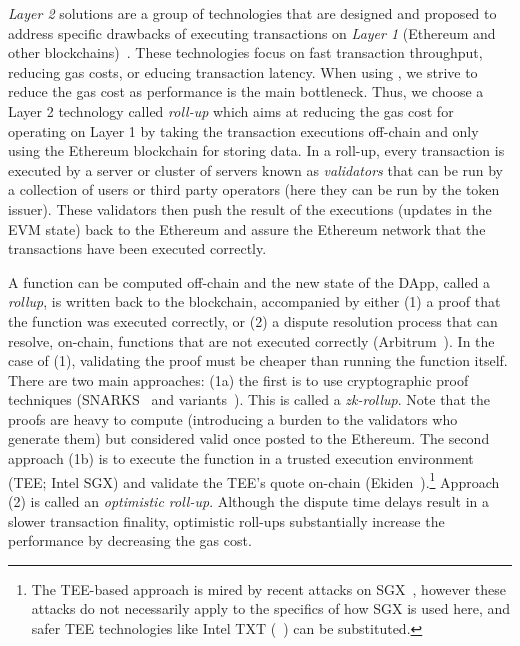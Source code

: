 

\textit{Layer 2} solutions are a group of technologies that are designed and proposed to address specific drawbacks of executing transactions on \textit{Layer 1} (\ie Ethereum and other blockchains)~\cite{gudgeon2020sok}. These technologies focus on fast transaction throughput, reducing gas costs, or educing transaction latency. When using \cm, we strive to reduce the gas cost as performance is the main bottleneck. Thus, we choose a Layer 2 technology called \textit{roll-up} which aims at reducing the gas cost for operating on Layer 1 by taking the transaction executions off-chain and only using the Ethereum blockchain for storing data. In a roll-up, every transaction is executed by a server or cluster of servers known as \textit{validators} that can be run by a collection of users or third party operators (here they can be run by the token issuer). These validators then push the result of the executions (\ie updates in the EVM state) back to the Ethereum and assure the Ethereum network that the transactions have been executed correctly.

A function can be computed off-chain and the new state of the DApp, called a \textit{rollup}, is written back to the blockchain, accompanied by either (1) a proof that the function was executed correctly, or (2) a dispute resolution process that can resolve, on-chain, functions that are not executed correctly (\eg Arbitrum~\cite{kalodner2018arbitrum}). In the case of (1), validating the proof must be cheaper than running the function itself. There are two main approaches: (1a) the first is to use cryptographic proof techniques (\eg SNARKS~\cite{BCGTV13,GGPR13} and variants~\cite{BBHR19}). This is called a \textit{zk-rollup}. Note that the proofs are heavy to compute (introducing a burden to the validators who generate them) but considered valid once posted to the Ethereum. The second approach (1b) is to execute the function in a trusted execution environment (TEE; \eg Intel SGX) and validate the TEE's quote on-chain (\eg Ekiden~\cite{cheng2019ekiden}).\footnote{The TEE-based approach is mired by recent attacks on SGX~\cite{SGX1,SGX2,SGX3,SGX4}, however these attacks do not necessarily apply to the specifics of how SGX is used here, and safer TEE technologies like Intel TXT (\cf~\cite{ZBC+19}) can be substituted.} Approach (2) is called an \textit{optimistic roll-up}. Although the dispute time delays result in a slower transaction finality, optimistic roll-ups substantially increase the performance by decreasing the gas cost. 

